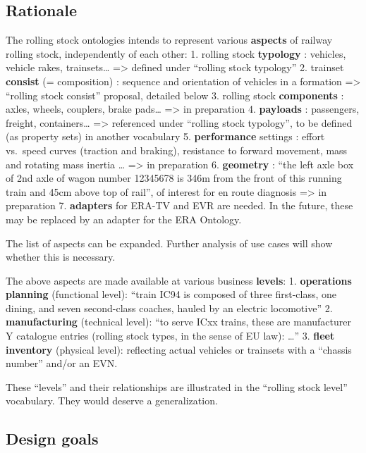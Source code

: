 \documentclass[
  11pt,
]{article}
\begin{document}
\hypertarget{rationale}{%
\subsection{Rationale}\label{rationale}}

The rolling stock ontologies intends to represent various
\textbf{aspects} of railway rolling stock, independently of each other:
1. rolling stock \textbf{typology} : vehicles, vehicle rakes,
trainsets\ldots{} =\textgreater{} defined under ``rolling stock
typology'' 2. trainset \textbf{consist} (= composition) : sequence and
orientation of vehicles in a formation =\textgreater{} ``rolling stock
consist'' proposal, detailed below 3. rolling stock \textbf{components}
: axles, wheels, couplers, brake pads\ldots{} =\textgreater{} in
preparation 4. \textbf{payloads} : passengers, freight,
containers\ldots{} =\textgreater{} referenced under ``rolling stock
typology'', to be defined (as property sets) in another vocabulary 5.
\textbf{performance} settings : effort vs.~speed curves (traction and
braking), resistance to forward movement, mass and rotating mass inertia
\ldots{} =\textgreater{} in preparation 6. \textbf{geometry} : ``the
left axle box of 2nd axle of wagon number 12345678 is 346m from the
front of this running train and 45cm above top of rail'', of interest
for en route diagnosis =\textgreater{} in preparation 7.
\textbf{adapters} for ERA-TV and EVR are needed. In the future, these
may be replaced by an adapter for the ERA Ontology.

The list of aspects can be expanded. Further analysis of use cases will
show whether this is necessary.

The above aspects are made available at various business
\textbf{levels}: 1. \textbf{operations planning} (functional level):
``train IC94 is composed of three first-class, one dining, and seven
second-class coaches, hauled by an electric locomotive'' 2.
\textbf{manufacturing} (technical level): ``to serve ICxx trains, these
are manufacturer Y catalogue entries (rolling stock types, in the sense
of EU law): \ldots{}'' 3. \textbf{fleet inventory} (physical level):
reflecting actual vehicles or trainsets with a ``chassis number'' and/or
an EVN.

These ``levels'' and their relationships are illustrated in the
``rolling stock level'' vocabulary. They would deserve a generalization.

\hypertarget{design-goals}{%
\subsection{Design goals}\label{design-goals}}
\end{document}
